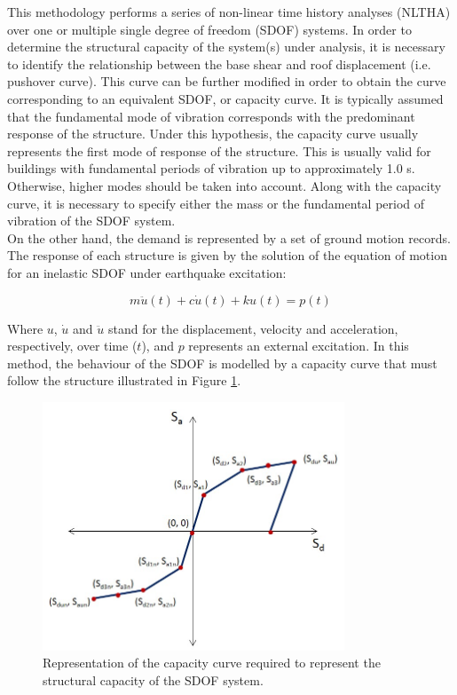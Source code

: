 This methodology performs a series of non-linear time history analyses (NLTHA) over one or multiple single degree of freedom (SDOF) systems. In order to determine the structural capacity of the system(s) under analysis, it is necessary to identify the relationship between the base shear and roof displacement (i.e. pushover curve). This curve can be further modified in order to obtain the curve corresponding to an equivalent SDOF, or capacity curve. It is typically assumed that the fundamental mode of vibration corresponds with the predominant response of the structure. Under this hypothesis, the capacity curve usually represents the first mode of response of the structure. This is usually valid for buildings with fundamental periods of vibration up to approximately 1.0 s. Otherwise, higher modes should be taken into account. Along with the capacity curve, it is necessary to specify either the mass or the fundamental period of vibration of the SDOF system.\\

On the other hand, the demand is represented by a set of ground motion records. The response of each structure is given by the solution of the equation of motion for an inelastic SDOF under earthquake excitation:

\begin{equation}
m\ddot{u}(t) + c\dot{u}(t) + ku(t) = p(t)
\end{equation}

Where $u$, $\dot{u}$ and $\ddot{u}$ stand for the displacement, velocity and acceleration, respectively, over time ($t$), and $p$ represents an external excitation. In this method, the behaviour of the SDOF is modelled by a capacity curve that must follow the structure illustrated in Figure \ref{fig:backbone}.

\begin{figure}[htb]
  \centering
      \includegraphics[width=9cm]{Figures/backbone_curve.png}
  \caption{Representation of the capacity curve required to represent the structural capacity of the SDOF system.}
  \label{fig:backbone}
\end{figure}

